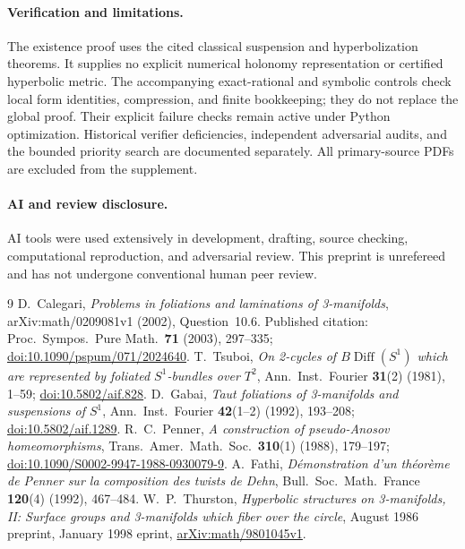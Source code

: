 \documentclass[11pt]{article}
\newcommand{\Diff}{\operatorname{Diff}}
\begin{document}
\paragraph{Verification and limitations.}
The existence proof uses the cited classical suspension and
hyperbolization theorems. It supplies no explicit numerical holonomy
representation or certified hyperbolic metric.
The accompanying exact-rational and symbolic controls check local
form identities, compression, and finite bookkeeping; they do not
replace the global proof. Their explicit failure checks remain active
under Python optimization. Historical verifier deficiencies, independent
adversarial audits, and the bounded priority search are documented
separately. All primary-source PDFs are excluded from the supplement.

\paragraph{AI and review disclosure.}
AI tools were used extensively in development, drafting, source checking,
computational reproduction, and adversarial review. This preprint is
unrefereed and has not undergone conventional human peer review.

\begin{thebibliography}{9}
 D.~Calegari,
\emph{Problems in foliations and laminations of 3-manifolds},
arXiv:math/0209081v1 (2002), Question~10.6.
Published citation: Proc.\ Sympos.\ Pure Math.\ \textbf{71} (2003), 297--335;
\href{https://doi.org/10.1090/pspum/071/2024640}{doi:10.1090/pspum/071/2024640}.
 T.~Tsuboi,
\emph{On 2-cycles of $B\Diff(S^1)$ which are represented by foliated
$S^1$-bundles over $T^2$},
Ann.\ Inst.\ Fourier \textbf{31}(2) (1981), 1--59;
\href{https://doi.org/10.5802/aif.828}{doi:10.5802/aif.828}.
 D.~Gabai,
\emph{Taut foliations of 3-manifolds and suspensions of $S^1$},
Ann.\ Inst.\ Fourier \textbf{42}(1--2) (1992), 193--208;
\href{https://doi.org/10.5802/aif.1289}{doi:10.5802/aif.1289}.
 R.~C.~Penner,
\emph{A construction of pseudo-Anosov homeomorphisms},
Trans.\ Amer.\ Math.\ Soc.\ \textbf{310}(1) (1988), 179--197;
\href{https://doi.org/10.1090/S0002-9947-1988-0930079-9}
{doi:10.1090/S0002-9947-1988-0930079-9}.
 A.~Fathi,
\emph{D\'emonstration d'un th\'eor\`eme de Penner sur la composition
des twists de Dehn},
Bull.\ Soc.\ Math.\ France \textbf{120}(4) (1992), 467--484.
 W.~P.~Thurston,
\emph{Hyperbolic structures on 3-manifolds, II: Surface groups and
3-manifolds which fiber over the circle},
August 1986 preprint, January 1998 eprint,
\href{https://arxiv.org/abs/math/9801045v1}{arXiv:math/9801045v1}.
\end{thebibliography}
\end{document}
